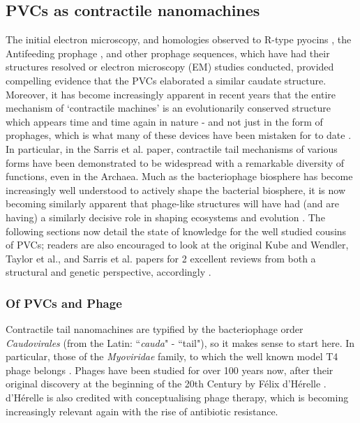 \subsection{PVCs as contractile nanomachines}
The initial electron microscopy, and homologies observed to R-type pyocins \citep{Ge2015}, the Antifeeding prophage \citep{Heymann2013},  and other prophage sequences, which have had their structures resolved or electron microscopy (EM) studies conducted, provided compelling evidence that the PVCs elaborated a similar caudate structure. Moreover, it has become increasingly apparent in recent years that the entire mechanism of `contractile machines' is an evolutionarily conserved structure which appears time and time again in nature - and not just in the form of prophages, which is what many of these devices have been mistaken for to date \citep{Kube2015a, Sarris2014, Brackmann2017}. In particular, in the Sarris et al. paper, contractile tail mechanisms of various forms have been demonstrated to be widespread with a remarkable diversity of functions, even in the Archaea. Much as the bacteriophage biosphere has become increasingly well understood to actively shape the bacterial biosphere, it is now becoming similarly apparent that phage-like structures will have had (and are having) a similarly decisive role in shaping ecosystems and evolution \citep{Richard2014a}. The following sections now detail the state of knowledge for the well studied cousins of PVCs; readers are also encouraged to look at the original Kube and Wendler, Taylor et al., and Sarris et al. papers for 2 excellent reviews from both a structural and genetic perspective, accordingly \citep{Kube2015a, Sarris2014, Taylor2018a}.

\subsubsection{Of PVCs and Phage}
Contractile tail nanomachines are typified by the bacteriophage order \emph{Caudovirales} (from the Latin: ``\emph{cauda}" - ``tail"), so it makes sense to start here. In particular, those of the \emph{Myoviridae} family, to which the well known model T4 phage belongs \citep{Ackermann1998}. Phages have been studied for over 100 years now, after their original discovery at the beginning of the 20th Century by F\'elix d'H\'erelle \citep{DHerelle1917}. d'H\'erelle is also credited with conceptualising phage therapy, which is becoming increasingly relevant again with the rise of antibiotic resistance.

